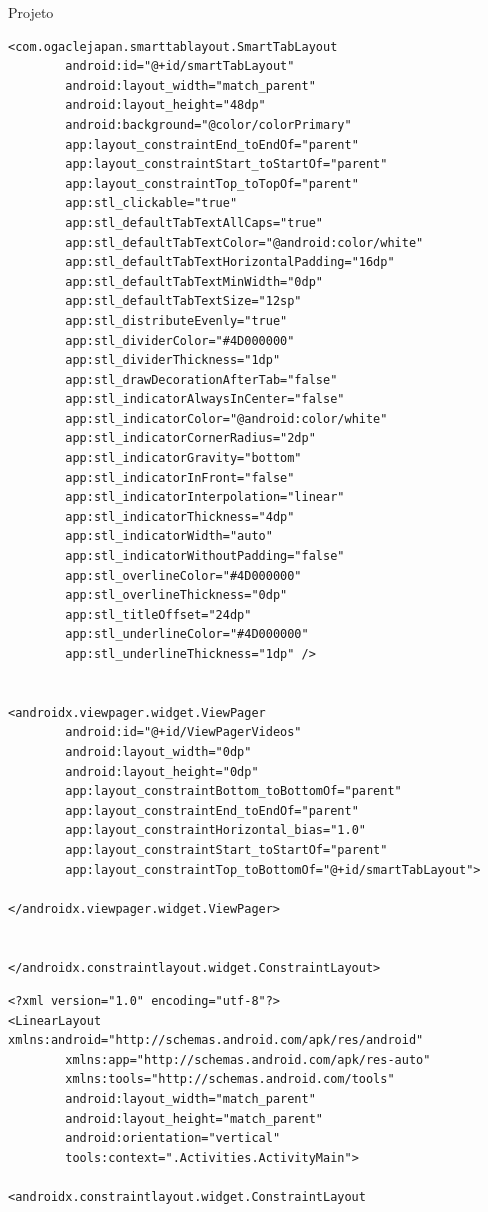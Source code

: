 \documentclass[
	12pt,				%
	openright,			%
	twoside,			%
	a4paper,			%
	english,			%
	french,				%
	spanish,			%
	brazil				%
	]{abntex2}
\begin{document}
\begin{chapter}{Projeto}
\begin{lstlisting}[numbers=none,basicstyle=\small,
caption={ActivityVideos.xml},
title={ActivityVideos.xml},
label={ActivityVideos.xml}]
<com.ogaclejapan.smarttablayout.SmartTabLayout
		android:id="@+id/smartTabLayout"
		android:layout_width="match_parent"
		android:layout_height="48dp"
		android:background="@color/colorPrimary"
		app:layout_constraintEnd_toEndOf="parent"
		app:layout_constraintStart_toStartOf="parent"
		app:layout_constraintTop_toTopOf="parent"
		app:stl_clickable="true"
		app:stl_defaultTabTextAllCaps="true"
		app:stl_defaultTabTextColor="@android:color/white"
		app:stl_defaultTabTextHorizontalPadding="16dp"
		app:stl_defaultTabTextMinWidth="0dp"
		app:stl_defaultTabTextSize="12sp"
		app:stl_distributeEvenly="true"
		app:stl_dividerColor="#4D000000"
		app:stl_dividerThickness="1dp"
		app:stl_drawDecorationAfterTab="false"
		app:stl_indicatorAlwaysInCenter="false"
		app:stl_indicatorColor="@android:color/white"
		app:stl_indicatorCornerRadius="2dp"
		app:stl_indicatorGravity="bottom"
		app:stl_indicatorInFront="false"
		app:stl_indicatorInterpolation="linear"
		app:stl_indicatorThickness="4dp"
		app:stl_indicatorWidth="auto"
		app:stl_indicatorWithoutPadding="false"
		app:stl_overlineColor="#4D000000"
		app:stl_overlineThickness="0dp"
		app:stl_titleOffset="24dp"
		app:stl_underlineColor="#4D000000"
		app:stl_underlineThickness="1dp" />


<androidx.viewpager.widget.ViewPager
		android:id="@+id/ViewPagerVideos"
		android:layout_width="0dp"
		android:layout_height="0dp"
		app:layout_constraintBottom_toBottomOf="parent"
		app:layout_constraintEnd_toEndOf="parent"
		app:layout_constraintHorizontal_bias="1.0"
		app:layout_constraintStart_toStartOf="parent"
		app:layout_constraintTop_toBottomOf="@+id/smartTabLayout">

</androidx.viewpager.widget.ViewPager>


</androidx.constraintlayout.widget.ConstraintLayout>
\end{lstlisting}

\begin{lstlisting}[numbers=none,basicstyle=\small,
caption={FragmentVideos.xml},
title={FragmentVideos.xml},
label={FragmentVideos.xml}]
<?xml version="1.0" encoding="utf-8"?>
<LinearLayout xmlns:android="http://schemas.android.com/apk/res/android"
		xmlns:app="http://schemas.android.com/apk/res-auto"
		xmlns:tools="http://schemas.android.com/tools"
		android:layout_width="match_parent"
		android:layout_height="match_parent"
		android:orientation="vertical"
		tools:context=".Activities.ActivityMain">

<androidx.constraintlayout.widget.ConstraintLayout


\end{lstlisting}
\end{chapter}
\end{document}
